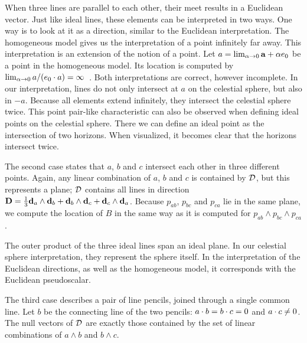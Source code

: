 When three lines are parallel to each other, their meet results in a Euclidean vector.  Just like ideal lines, these elements can be interpreted in two ways.  One way is to look at it as a direction, similar to the Euclidean interpretation.  The homogeneous model gives us the interpretation of a point infinitely far away.  This interpretation is an extension of the notion of a point.  Let $a = \lim_{\alpha \to 0} \mathbf{a} + \alpha e_0$ be a point in the homogeneous model.  Its location is computed by $\lim_{\alpha \to 0} a / (e_0 \mathbin{\cdot} a) = \infty$~\cite[Section 11.2]{TheBook}.  Both interpretations are correct, however incomplete.  In our interpretation, lines do not only intersect at $a$ on the celestial sphere, but also in $-a$.  Because all elements extend infinitely, they intersect the celestial sphere twice.  This point pair-like characteristic can also be observed when defining ideal points on the celestial sphere.  There we can define an ideal point as the intersection of two horizons.  When visualized, it becomes clear that the horizons intersect twice.

The second case states that $a$, $b$ and $c$ intersect each other in three different points.  Again, any linear combination of $a$, $b$ and $c$ is contained by $\mathcal{D}$, but this represents a plane; $\mathcal{D}$ contains all lines in direction $\mathbf{D} = \frac{1}{3} \mathbf{d}_a \wedge \mathbf{d}_b + \mathbf{d}_b \wedge \mathbf{d}_c + \mathbf{d}_c \wedge \mathbf{d}_a$.  Because $p_{ab}$, $p_{bc}$ and $p_{ca}$ lie in the same plane, we compute the location of $B$ in the same way as it is computed for $p_{ab} \wedge p_{bc} \wedge p_{ca}$.

The outer product of the three ideal lines span an ideal plane.  In our celestial sphere interpretation, they represent the sphere itself.  In the interpretation of the Euclidean directions, as well as the homogeneous model, it corresponds with the Euclidean pseudoscalar.

The third case describes a pair of line pencils, joined through a single common line.  Let $b$ be the connecting line of the two pencils: $a \mathbin{\cdot} b = b \mathbin{\cdot} c = 0$ and $a \mathbin{\cdot} c \not= 0$. The null vectors of $\mathcal{D}$ are exactly those contained by the set of linear combinations of $a \wedge b$ and $b \wedge c$.

